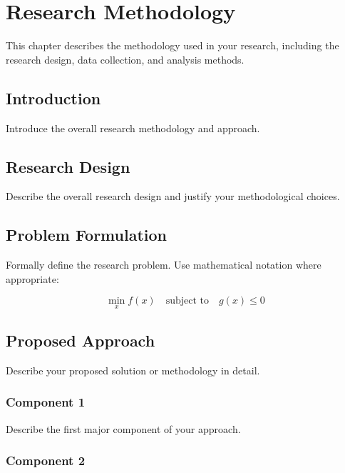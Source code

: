 \chapter{Research Methodology}
\label{ch:methodology}

This chapter describes the methodology used in your research, including the research design, data collection, and analysis methods.

\section{Introduction}
\label{sec:meth-introduction}

Introduce the overall research methodology and approach.

\section{Research Design}
\label{sec:research-design}

Describe the overall research design and justify your methodological choices.

\section{Problem Formulation}
\label{sec:problem-formulation}

Formally define the research problem. Use mathematical notation where appropriate:

\begin{equation}
    \min_{x} f(x) \quad \text{subject to} \quad g(x) \leq 0
    \label{eq:optimization}
\end{equation}

\section{Proposed Approach}
\label{sec:proposed-approach}

Describe your proposed solution or methodology in detail.

\subsection{Component 1}
\label{subsec:component1}

Describe the first major component of your approach.

\subsection{Component 2}
\label{subsec:component2}

